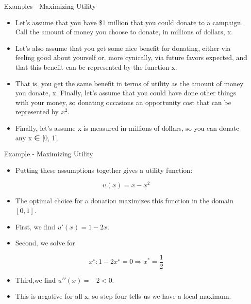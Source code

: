 \documentclass[
  ignorenonframetext,
]{beamer}
\providecommand{\tightlist}{%
  \setlength{\itemsep}{0pt}\setlength{\parskip}{0pt}}
\begin{document}
\begin{frame}{Examples - Maximizing Utility}
\protect\hypertarget{examples---maximizing-utility}{}

\begin{itemize}
\item
  Let's assume that you have \$1 million that you could donate to a
  campaign. Call the amount of money you choose to donate, in millions
  of dollars, x.
\item
  Let's also assume that you get some nice benefit for donating, either
  via feeling good about yourself or, more cynically, via future favors
  expected, and that this benefit can be represented by the function x.
\item
  That is, you get the same benefit in terms of utility as the amount of
  money you donate, x. Finally, let's assume that you could have done
  other things with your money, so donating occasions an opportunity
  cost that can be represented by \(x^{2}\).
\item
  Finally, let's assume x is measured in millions of dollars, so you can
  donate any x ∈ {[}0, 1{]}.
\end{itemize}

\end{frame}

\begin{frame}{Example - Maximizing Utility}
\protect\hypertarget{example---maximizing-utility}{}

\begin{itemize}
\tightlist
\item
  Putting these assumptions together gives a utility function:
\end{itemize}

\[u(x) = x − x^{2}\]

\begin{itemize}
\item
  The optimal choice for a donation maximizes this function in the
  domain \([0, 1]\).
\item
  First, we find \(u′(x) = 1 − 2x\).
\item
  Second, we solve for
\end{itemize}

\[x^{∗}: 1−2x^{∗} =0⇒x^{*} = \frac{1}{2}\]

\begin{itemize}
\item
  Third,we find \(u′′(x)=−2<0\).
\item
  This is negative for all x, so step four tells us we have a local
  maximum.
\end{itemize}

\end{frame}
\end{document}
